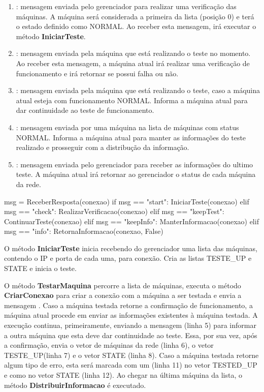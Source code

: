 \vspace*{1cm}
\begin{enumerate}
    \item \textbf{}: mensagem enviada pelo gerenciador para realizar uma verificação das máquinas. A máquina será considerada a primeira da lista (posição 0) e terá o estado definido como NORMAL. Ao receber esta mensagem,
    irá executar o método \textbf{IniciarTeste}.
    \item \textbf{}: mensagem enviada pela máquina que está realizando o teste no momento. Ao receber esta mensagem, a máquina atual irá realizar uma verificação de funcionamento e 
    irá retornar se possui falha ou não.
    \item \textbf{}: mensagem enviada pela máquina que está realizando o teste, caso a máquina atual esteja com funcionamento NORMAL. Informa a máquina atual para dar continuidade ao teste de funcionamento.
    \item \textbf{}: mensagem enviada por uma máquina na lista de máquinas com status NORMAL. Informa a máquina atual para manter as informações do teste realizado e prosseguir com a distribução da informação.
    \item \textbf{}: mensagem enviada pelo gerenciador para receber as informações do ultimo teste. A máquina atual irá retornar ao gerenciador o status de cada máquina da rede.
  \end{enumerate}

\vspace*{1cm}
\begin{python}
    msg = ReceberResposta(conexao)
    if msg == "start":
        IniciarTeste(conexao)
    elif msg == "check":
        RealizarVerificacao(conexao)
    elif msg == "keepTest":
        ContinuarTeste(conexao)
    elif msg == "keepInfo":
        ManterInformacao(conexao)
    elif msg == "info":
        RetornaInformacao(conexao, False)
\end{python}
\vspace*{1cm}

O método \textbf{IniciarTeste} inicia recebendo do gerenciador uma lista das máquinas, contendo o IP e porta de cada uma, para conexão. Cria as listas TESTE\_UP e STATE e inicia o teste.

O método \textbf{TestarMaquina} percorre a lista de máquinas, executa o método \textbf{CriarConexao} para criar a conexão com a máquina a ser testada e envia a mensagem \textbf{}. Caso 
a máquina testada retorne a confirmação de funcionamento, a máquina atual procede em enviar as informações existentes à máquina testada. A execução continua, primeiramente, enviando a mensagem \textbf{} (linha 5)
para informar a outra máquina que esta deve dar continuidade ao teste. Essa, por sua vez, após a confirmação, envia o vetor de máquinas da rede (linha 6), o vetor TESTE\_UP(linha 7) e o vetor STATE (linha 8).
Caso a máquina testada retorne algum tipo de erro, esta será marcada com um  (linha 11) no vetor TESTED\_UP e como  no vetor STATE (linha 12). Ao chegar na última máquina da lista, o método \textbf{DistribuirInformacao} é executado.

